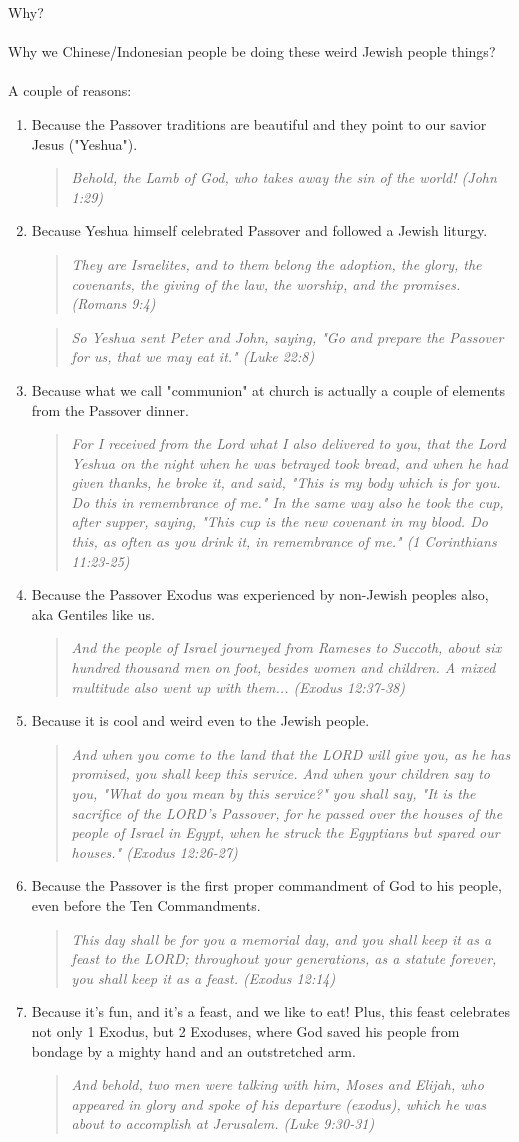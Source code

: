 \documentclass[10pt,oneside,footinclude=true,headinclude=true]{scrbook} %
\newcommand\quot[1]{
	\begin{quote}\textit{\small#1}\end{quote}
}
\begin{document}
Why?\\
\\
Why we Chinese/Indonesian people be doing these weird Jewish people things?\\
\\
A couple of reasons:
\begin{enumerate}
	\item{
		Because the Passover traditions are beautiful and they point to our savior Jesus ("Yeshua").
		\quot{Behold, the Lamb of God, who takes away the sin of the world! (John 1:29)}
	}
	\item{
		Because Yeshua himself celebrated Passover and followed a Jewish liturgy.
		\quot{They are Israelites, and to them belong the adoption, the glory, the covenants, the giving of the law, the worship, and the promises. (Romans 9:4)}
		\quot{So Yeshua sent Peter and John, saying, "Go and prepare the Passover for us, that we may eat it." (Luke 22:8)}
	}
	\item{
		Because what we call "communion" at church is actually a couple of elements from the Passover dinner.
		\quot{For I received from the Lord what I also delivered to you, that the Lord Yeshua on the night when he was betrayed took bread, and when he had given thanks, he broke it, and said, "This is my body which is for you. Do this in remembrance of me." In the same way also he took the cup, after supper, saying, "This cup is the new covenant in my blood. Do this, as often as you drink it, in remembrance of me." (1 Corinthians 11:23-25)}
	}
	\item{
		Because the Passover Exodus was experienced by non-Jewish peoples also, aka Gentiles like us.
		\quot{And the people of Israel journeyed from Rameses to Succoth, about six hundred thousand men on foot, besides women and children. A mixed multitude also went up with them... (Exodus 12:37-38)}
	}
	\item{
		Because it is cool and weird even to the Jewish people.
		\quot{And when you come to the land that the LORD will give you, as he has promised, you shall keep this service. And when your children say to you, "What do you mean by this service?" you shall say, "It is the sacrifice of the LORD's Passover, for he passed over the houses of the people of Israel in Egypt, when he struck the Egyptians but spared our houses." (Exodus 12:26-27)}
	}
	\item{
		Because the Passover is the first proper commandment of God to his people, even before the Ten Commandments.
		\quot{This day shall be for you a memorial day, and you shall keep it as a feast to the LORD; throughout your generations, as a statute forever, you shall keep it as a feast. (Exodus 12:14)}
	}
	\item{
		Because it's fun, and it's a feast, and we like to eat! Plus, this feast celebrates not only 1 Exodus, but 2 Exoduses, where God saved his people from bondage by a mighty hand and an outstretched arm.
		\quot{And behold, two men were talking with him, Moses and Elijah, who appeared in glory and spoke of his departure (exodus), which he was about to accomplish at Jerusalem. (Luke 9:30-31)}
	}
\end{enumerate}
\end{document}
